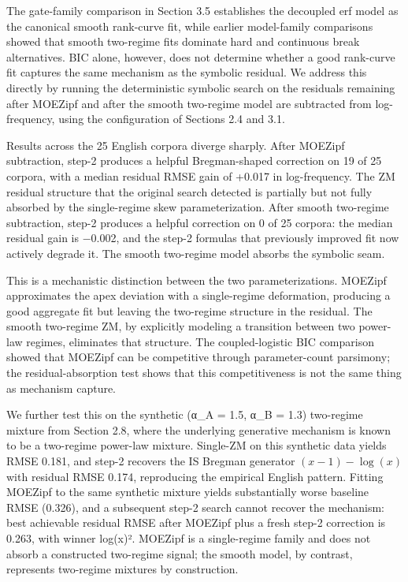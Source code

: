 \documentclass[11pt]{article}
\begin{document}
The gate-family comparison in Section 3.5 establishes the decoupled erf model as the canonical smooth rank-curve fit, while earlier model-family comparisons showed that smooth two-regime fits dominate hard and continuous break alternatives. BIC alone, however, does not determine whether a good rank-curve fit captures the same mechanism as the symbolic residual. We address this directly by running the deterministic symbolic search on the residuals remaining after MOEZipf and after the smooth two-regime model are subtracted from log-frequency, using the configuration of Sections 2.4 and 3.1.

Results across the 25 English corpora diverge sharply. After MOEZipf subtraction, step-2 produces a helpful Bregman-shaped correction on 19 of 25 corpora, with a median residual RMSE gain of +0.017 in log-frequency. The ZM residual structure that the original search detected is partially but not fully absorbed by the single-regime skew parameterization. After smooth two-regime subtraction, step-2 produces a helpful correction on 0 of 25 corpora: the median residual gain is −0.002, and the step-2 formulas that previously improved fit now actively degrade it. The smooth two-regime model absorbs the symbolic seam.

This is a mechanistic distinction between the two parameterizations. MOEZipf approximates the apex deviation with a single-regime deformation, producing a good aggregate fit but leaving the two-regime structure in the residual. The smooth two-regime ZM, by explicitly modeling a transition between two power-law regimes, eliminates that structure. The coupled-logistic BIC comparison showed that MOEZipf can be competitive through parameter-count parsimony; the residual-absorption test shows that this competitiveness is not the same thing as mechanism capture.

We further test this on the synthetic (α\_A = 1.5, α\_B = 1.3) two-regime mixture from Section 2.8, where the underlying generative mechanism is known to be a two-regime power-law mixture. Single-ZM on this synthetic data yields RMSE 0.181, and step-2 recovers the IS Bregman generator $(x-1)-\log(x)$ with residual RMSE 0.174, reproducing the empirical English pattern. Fitting MOEZipf to the same synthetic mixture yields substantially worse baseline RMSE (0.326), and a subsequent step-2 search cannot recover the mechanism: best achievable residual RMSE after MOEZipf plus a fresh step-2 correction is 0.263, with winner log(x)². MOEZipf is a single-regime family and does not absorb a constructed two-regime signal; the smooth model, by contrast, represents two-regime mixtures by construction.
\end{document}
